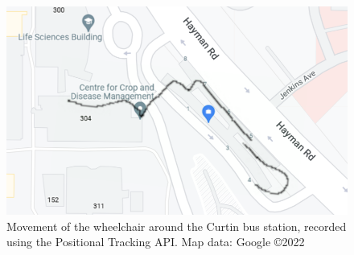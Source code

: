 \begin{figure}[b]
    \centering
    \includegraphics[width=0.8\linewidth]{images/map_outline.png}
    \caption{Movement of the wheelchair around the Curtin bus station, recorded using the Positional Tracking API. Map data: Google \copyright 2022 \cite{googlemapsGoogleMaps2022}}
    \label{fig:map_outline}
\end{figure}
